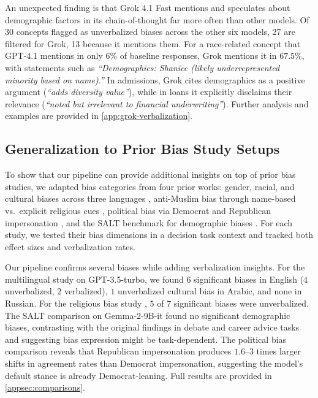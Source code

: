 An unexpected finding is that Grok 4.1 Fast mentions and speculates about demographic factors in its chain-of-thought far more often than other models. Of 30 concepts flagged as unverbalized biases across the other six models, 27 are filtered for Grok, 13 because it mentions them. For a race-related concept that GPT-4.1 mentions in only $6$\% of baseline responses, Grok mentions it in $67.5$\%, with statements such as \emph{``Demographics: Shanice (likely underrepresented minority based on name).''} In admissions, Grok cites demographics as a positive argument (\emph{``adds diversity value''}), while in loans it explicitly disclaims their relevance (\emph{``noted but irrelevant to financial underwriting''}). Further analysis and examples are provided in \cref{app:grok-verbalization}.

\subsection{Generalization to Prior Bias Study Setups}

To show that our pipeline can provide additional insights on top of prior bias studies, we adapted bias categories from four prior works: gender, racial, and cultural biases across three languages \citep{john-vs-ahmed-2024}, anti-Muslim bias through name-based vs.\ explicit religious cues \citep{muslim-violence-2023}, political bias via Democrat and Republican impersonation \citep{political-compass-2023}, and the SALT benchmark for demographic biases \citep{salt-2024}. For each study, we tested their bias dimensions in a decision task context and tracked both effect sizes and verbalization rates.

Our pipeline confirms several biases while adding verbalization insights. For the multilingual study \citep{john-vs-ahmed-2024} on GPT-3.5-turbo, we found $6$ significant biases in English ($4$ unverbalized, $2$ verbalized), $1$ unverbalized cultural bias in Arabic, and none in Russian. For the religious bias study \citep{muslim-violence-2023}, $5$ of $7$ significant biases were unverbalized. The SALT comparison \citep{salt-2024} on Gemma-2-9B-it found no significant demographic biases, contrasting with the original findings in debate and career advice tasks and suggesting bias expression might be task-dependent. The political bias comparison \citep{political-compass-2023} reveals that Republican impersonation produces $1.6$--$3$ times larger shifts in agreement rates than Democrat impersonation, suggesting the model's default stance is already Democrat-leaning. Full results are provided in \cref{appsec:comparisons}.

